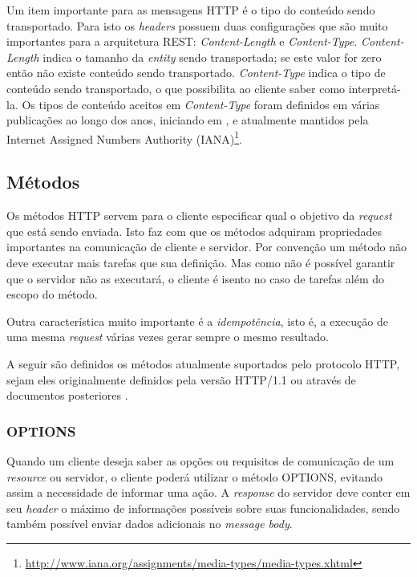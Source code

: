 Um item importante para as mensagens HTTP é o tipo do conteúdo sendo transportado. Para isto os \textit{headers} possuem duas configurações que são muito importantes para a arquitetura REST: \textit{Content-Length} e \textit{Content-Type}. \textit{Content-Length} indica o tamanho da \textit{entity} sendo transportada; se este valor for zero então não existe conteúdo sendo transportado. \textit{Content-Type} indica o tipo de conteúdo sendo transportado, o que possibilita ao cliente saber como interpretá-la. Os tipos de conteúdo aceitos em \textit{Content-Type} foram definidos em várias publicações ao longo dos anos, iniciando em , e atualmente mantidos pela Internet Assigned Numbers Authority (IANA)\footnote{\url{http://www.iana.org/assignments/media-types/media-types.xhtml}}.


\subsection{Métodos}
\label{sec:http:meth}
Os métodos HTTP servem para o cliente especificar qual o objetivo da \textit{request} que está sendo enviada. Isto faz com que os métodos adquiram propriedades importantes na comunicação de cliente e servidor. Por convenção um método não deve executar mais tarefas que sua definição. Mas como não é possível garantir que o servidor não as executará, o cliente é isento no caso de tarefas além do escopo do método.

Outra característica muito importante é a \textit{idempotência}, isto é, a execução de uma mesma \textit{request} várias vezes gerar sempre o mesmo resultado.

A seguir são definidos os métodos atualmente suportados pelo protocolo HTTP, sejam eles originalmente definidos pela versão HTTP/1.1 ou através de documentos posteriores \cite{RFC7231}.



\subsubsection{OPTIONS}
Quando um cliente deseja saber as opções ou requisitos de comunicação de um \textit{resource} ou servidor, o cliente poderá utilizar o método OPTIONS, evitando assim a necessidade de informar uma ação. A \textit{response} do servidor deve conter em seu \textit{header} o máximo de informações possíveis sobre suas funcionalidades, sendo também possível enviar dados adicionais no \textit{message body}.

